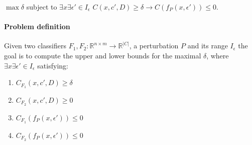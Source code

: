 $\max{\delta}$ subject to $\exists{x}\exists{\epsilon'}\in{I_\epsilon}$ $C(x,c',D) \geq \delta \rightarrow C(f_P(x,\epsilon'))\leq 0$.


\paragraph{Problem definition} Given two classifiers $F_1,F_2: \mathbb{R}^{n \times m} \rightarrow {\mathbb{R}}^{|C|}$, a perturbation $P$ and its range $I_\epsilon$ the goal is to compute the upper and lower bounds for the maximal $\delta$, where $\exists{x}\exists{\epsilon'}\in{I_\epsilon}$ satisfying:

\begin{enumerate}
    \item $C_{F_1}(x,c',D) \geq \delta$
    \item $C_{F_2}(x,c',D) \geq 0$
    \item $C_{F_1}(f_P(x,\epsilon'))\leq 0$
    \item $C_{F_2}(f_P(x,\epsilon'))\leq 0$
\end{enumerate}

